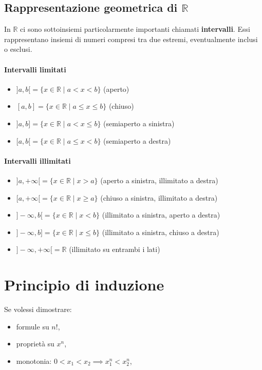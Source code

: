 \subsection{Rappresentazione geometrica di \texorpdfstring{$\mathbb{R}$}{R}}
In $\mathbb{R}$ ci sono sottoinsiemi particolarmente importanti chiamati \textbf{intervalli}. Essi rappresentano insiemi di numeri compresi tra due estremi, eventualmente inclusi o esclusi.

\paragraph{Intervalli limitati}

\begin{itemize}
  \item $]a,b[ = \{ x \in \mathbb{R} \mid a < x < b \}$ (aperto)
  \item $[a,b] = \{ x \in \mathbb{R} \mid a \le x \le b \}$ (chiuso)
  \item $]a,b] = \{ x \in \mathbb{R} \mid a < x \le b \}$ (semiaperto a sinistra)
  \item $[a,b[ = \{ x \in \mathbb{R} \mid a \le x < b \}$ (semiaperto a destra)
\end{itemize}

\paragraph{Intervalli illimitati}

\begin{itemize}
  \item $]a, +\infty[ = \{ x \in \mathbb{R} \mid x > a \}$ (aperto a sinistra, illimitato a destra)
  \item $[a, +\infty[ = \{ x \in \mathbb{R} \mid x \ge a \}$ (chiuso a sinistra, illimitato a destra)
  \item $]-\infty, b[ = \{ x \in \mathbb{R} \mid x < b \}$ (illimitato a sinistra, aperto a destra)
  \item $]-\infty, b] = \{ x \in \mathbb{R} \mid x \le b \}$ (illimitato a sinistra, chiuso a destra)
  \item $]-\infty, +\infty[ = \mathbb{R}$ (illimitato su entrambi i lati)
\end{itemize}

\section{Principio di induzione}
Se volessi dimostrare:
\begin{itemize}
\item formule su $n!$,
\item proprietà su $x^n$,
\item monotonia: $0 < x_1 < x_2 \implies x_1^n < x_2^n$,
\end{itemize}

